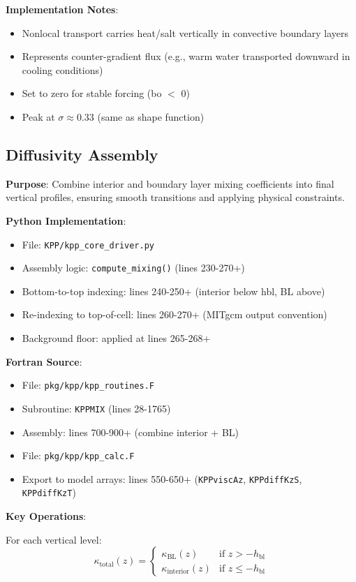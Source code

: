 \documentclass[11pt]{article}
\begin{document}
\textbf{Implementation Notes}:
\begin{itemize}
    \item Nonlocal transport carries heat/salt vertically in convective boundary layers
    \item Represents counter-gradient flux (e.g., warm water transported downward in cooling conditions)
    \item Set to zero for stable forcing (bo $<$ 0)
    \item Peak at $\sigma \approx 0.33$ (same as shape function)
\end{itemize}

\subsection{Diffusivity Assembly}

\textbf{Purpose}: Combine interior and boundary layer mixing coefficients into final vertical profiles, ensuring smooth transitions and applying physical constraints.

\textbf{Python Implementation}:
\begin{itemize}
    \item File: \verb|KPP/kpp_core_driver.py|
    \item Assembly logic: \verb|compute_mixing()| (lines 230-270+)
    \item Bottom-to-top indexing: lines 240-250+ (interior below hbl, BL above)
    \item Re-indexing to top-of-cell: lines 260-270+ (MITgcm output convention)
    \item Background floor: applied at lines 265-268+
\end{itemize}

\textbf{Fortran Source}:
\begin{itemize}
    \item File: \verb|pkg/kpp/kpp_routines.F|
    \item Subroutine: \verb|KPPMIX| (lines 28-1765)
    \item Assembly: lines 700-900+ (combine interior + BL)
    \item File: \verb|pkg/kpp/kpp_calc.F|
    \item Export to model arrays: lines 550-650+ (\verb|KPPviscAz|, \verb|KPPdiffKzS|, \verb|KPPdiffKzT|)
\end{itemize}

\textbf{Key Operations}:

For each vertical level:
\begin{equation}
\kappa_{\text{total}}(z) = \begin{cases}
\kappa_{\text{BL}}(z) & \text{if } z > -h_{\text{bl}} \\
\kappa_{\text{interior}}(z) & \text{if } z \leq -h_{\text{bl}}
\end{cases}
\end{equation}
\end{document}
